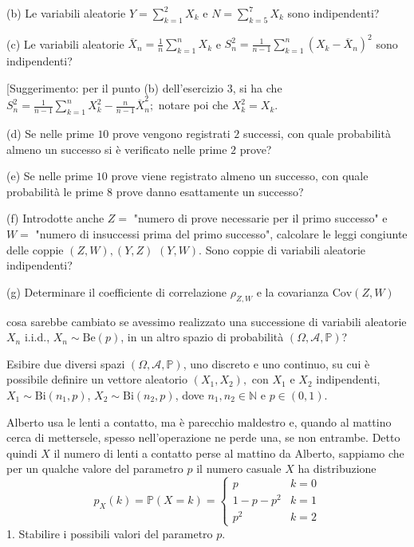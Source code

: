 (b) Le variabili aleatorie $Y=\sum _{k=1}^{2} X_{k}$ e $N=\sum _{k=5}^{7} X_{k}$ sono indipendenti?

(c) Le variabili aleatorie $\overline{X}_{n} =\frac{1}{n}\sum _{k=1}^{n} X_{k}$ e $S_{n}^{2} =\frac{1}{n-1}\sum _{k=1}^{n}( X_{k} -\overline{X}_{n})^{2}$ sono indipendenti?

[Suggerimento: per il punto (b) dell'esercizio 3, si ha che $S_{n}^{2} =\frac{1}{n-1}\sum _{k=1}^{n} X_{k}^{2} -\frac{n}{n-1}\overline{X}_{n}^{2} ;$ notare poi che $X_{k}^{2} =X_{k}$.

(d) Se nelle prime $10$ prove vengono registrati $2$ successi, con quale probabilità almeno un successo si è verificato nelle prime $2$ prove?

(e) Se nelle prime $10$ prove viene registrato almeno un successo, con quale probabilità le prime $8$ prove danno esattamente un successo?

(f) Introdotte anche $Z=$ "numero di prove necessarie per il primo successo" e $W=$ "numero di insuccessi prima del primo successo", calcolare le leggi congiunte delle coppie $(Z,W),(Y,Z)$ $(Y,W).$ Sono coppie di variabili aleatorie indipendenti?

(g) Determinare il coefficiente di correlazione $\rho _{Z,W}$ e la covarianza $\mathrm{Cov} (Z,W)$

cosa sarebbe cambiato se avessimo realizzato una successione di variabili aleatorie $X_{n}$ i.i.d., $X_{n} \sim \mathrm{Be} (p)$, in un altro spazio di probabilità $(\Omega ,\mathcal{A} ,\mathbb{P} )$?
\Esercizio{}

Esibire due diversi spazi $(\Omega ,\mathcal{A} ,\mathbb{P} )$, uno discreto e uno continuo, su cui è possibile definire un vettore aleatorio $( X_{1} ,X_{2}) ,$ con $X_{1}$ e $X_{2}$ indipendenti, $X_{1} \sim \mathrm{Bi}( n_{1} ,p)$, $X_{2} \sim \mathrm{Bi}( n_{2} ,p)$, dove $n_{1} ,n_{2} \in \mathbb{N}$ e $p\in (0,1)$.
\Esercizio{}

Alberto usa le lenti a contatto, ma è parecchio maldestro e, quando al mattino cerca di mettersele, spesso nell'operazione ne perde una, se non entrambe. Detto quindi $X$ il numero di lenti a contatto perse al mattino da Alberto, sappiamo che per un qualche valore del parametro $p$ il numero casuale $X$ ha distribuzione
\begin{equation*}
p_{X} (k)=\mathbb{P} (X=k)=\begin{cases}
p & k=0\\
1-p-p^{2} & k=1\\
p^{2} & k=2
\end{cases}
\end{equation*}
1. Stabilire i possibili valori del parametro $p$.

